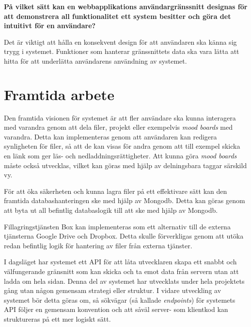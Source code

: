 \textbf{På vilket sätt kan en webbapplikations användargränssnitt designas för
att demonstrera all funktionalitet ett system besitter och göra det intuitivt
för en användare?}

Det är viktigt att hålla en konsekvent design för att användaren ska känna sig
trygg i systemet. Funktioner som hanterar gränssnittets data ska vara lätta att
hitta för att underlätta användarens användning av systemet.

\section{Framtida arbete}

Den framtida visionen för systemet är att fler användare ska kunna interagera
med varandra genom att dela filer, projekt eller exempelvis \emph{mood boards}
med varandra. Detta kan implementeras genom att användaren kan redigera
synligheten för filer, så att de kan visas för andra genom att till exempel
skicka en länk som ger läs- och nedladdningsrättigheter. Att kunna göra
\emph{mood boards} måste också utvecklas, vilket kan göras med hjälp av
delningsbara taggar särskild vy.

För att öka säkerheten och kunna lagra filer på ett effektivare sätt kan den
framtida databashanteringen ske med hjälp av Mongodb. Detta kan göras genom att
byta ut all befintlig databaslogik till att ske med hjälp av Mongodb.

Fillagringstjänsten Box kan implementeras som ett alternativ till de externa
tjänsterna Google Drive och Dropbox. Detta skulle förverkligas genom att utöka
redan befintlig logik för hantering av filer från externa tjänster.

I dagsläget har systemet ett API för att låta utvecklaren skapa ett snabbt och
välfungerande gränsnitt som kan skicka och ta emot data från servern utan att
ladda om hela sidan. Denna del av systemet har utvecklats under hela projektets
gång utan någon gemensam strategi eller struktur. I vidare utveckling av
systemet bör detta göras om, så sökvägar (så kallade \emph{endpoints}) för
systemets API följer en gemensam konvention och att såväl server- som klientkod
kan struktureras på ett mer logiskt sätt.
